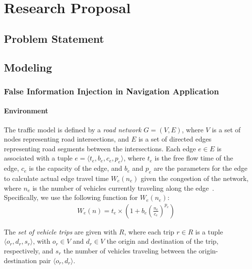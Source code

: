 \chapter{Research Proposal}
\label{chap:proposal}

\section{Problem Statement}

\section{Modeling}

\subsection{False Information Injection in Navigation Application}

\subsubsection{Environment}

The traffic model is defined by a \emph{road network} $G = (V, E)$, where $V$ is a set of nodes representing road intersections, and $E$ is a set of directed edges representing road segments between the intersections.
Each edge $e \in E$ is associated with a tuple $e = \langle t_e, b_e, c_e, p_e \rangle$, where $t_e$ is the free flow time of the edge, $c_e$ is the capacity of the edge, and $b_e$ and $p_e$ are the parameters for the edge to calculate actual edge travel time $W_e(n_e)$ given the congestion of the network, where $n_e$ is the number of vehicles currently traveling along the edge~\cite{transportationnetworks}.
Specifically, we use the following function for $W_e(n_e)$:
\begin{align}
    W_e(n) = t_e \times \left(1 + b_e \left(\frac{n_e}{c_e}\right)^{p_e}\right)
\end{align}

The \emph{set of vehicle trips} are given with $R$, where each trip $r \in R$ is a tuple $\langle o_r, d_r, s_r \rangle$, with $o_r \in V$ and $d_r \in V$ the origin and destination of the trip, respectively, and $s_r$ the number of vehicles traveling between the origin-destination pair $\langle o_r,d_r \rangle$. 

